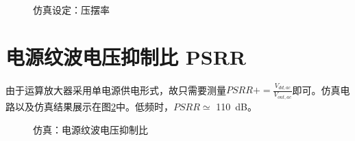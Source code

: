 \documentclass[UTF8]{ctexart}
\numberwithin{figure}{subsection}
\numberwithin{table}{subsection}
\numberwithin{equation}{subsection}
\begin{document}
\begin{figure}[H]
    \centering
    \caption{仿真设定：压摆率}
    \label{SR sim result}
\end{figure}


\section{电源纹波电压抑制比 PSRR}
由于运算放大器采用单电源供电形式，故只需要测量\(PSRR+ = \frac{V_{dd,ac}}{V_{out,ac}}\)即可。仿真电路以及仿真结果展示在图\ref{PSRR simulation}中。低频时，\(PSRR \simeq \) \SI[]{110}{\dB}。

\begin{figure}[H]
    \centering
    \caption{仿真：电源纹波电压抑制比}
    \label{PSRR simulation}
\end{figure}
\end{document}

